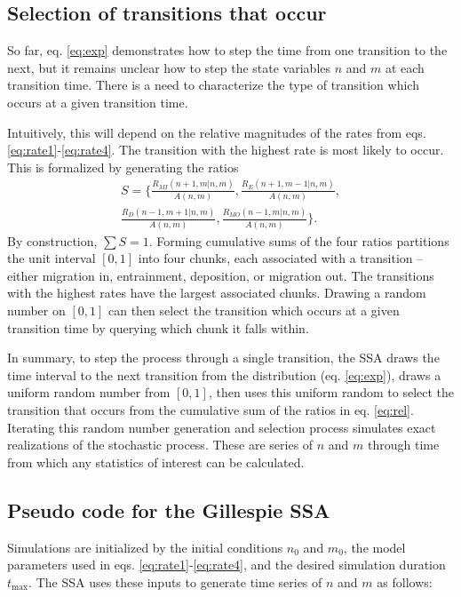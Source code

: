 \subsection{Selection of transitions that occur}

So far, eq. \ref{eq:exp} demonstrates how to step the time from one transition to the next, but it remains unclear how to step the state variables $n$ and $m$ at each transition time. There is a need to characterize the type of transition which occurs at a given transition time.

Intuitively, this will depend on the relative magnitudes of the rates from eqs. \ref{eq:rate1}-\ref{eq:rate4}.
The transition with the highest rate is most likely to occur.
This is formalized by generating the ratios
\begin{multline} S = \Bigg\{\frac{R_{MI}(n+1,m|n,m)}{ A(n,m)},
	\frac{R_E(n+1,m-1|n,m)}{ A(n,m)},\\
	\frac{R_D(n-1,m+1|n,m)}{ A(n,m)},
	\frac{R_{MO}(n-1,m|n,m)}{ A(n,m)}\Bigg\}. \label{eq:rel} \end{multline}
By construction, $\sum S=1$.
Forming cumulative sums of the four ratios partitions the unit interval $[0,1]$ into four chunks, each associated with a transition -- either migration in, entrainment, deposition, or migration out. The transitions with the highest rates have the largest associated chunks. Drawing a random number on $[0,1]$ can then select the transition which occurs at a given transition time by querying which chunk it falls within.

In summary, to step the process through a single transition, the SSA draws the time interval to the next transition from the distribution (eq. \ref{eq:exp}), draws a uniform random number from $[0,1]$, then uses this uniform random to select the transition that occurs from the cumulative sum of the ratios in eq. \ref{eq:rel}. Iterating this random number generation and selection process simulates exact realizations of the stochastic process. These are series of $n$ and $m$ through time from which any statistics of interest can be calculated.

\subsection{Pseudo code for the Gillespie SSA}

Simulations are initialized by the initial conditions $n_0$ and $m_0$, the model parameters used in eqs. \ref{eq:rate1}-\ref{eq:rate4}, and the desired simulation duration $t_\text{max}$. The SSA uses these inputs to generate time series of $n$ and $m$ as follows:

